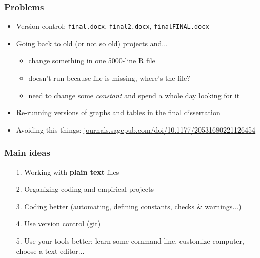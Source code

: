 \documentclass[aspectratio=43]{beamer}
\begin{document}
\begin{frame}
\frametitle{Problems}
\centering

\begin{itemize}
  \item<1-> Version control: \texttt{final.docx}, \texttt{final2.docx}, \texttt{finalFINAL.docx}
  \item<2-> Going back to old (or not so old) projects and...
  \begin{itemize}
    \item change something in one 5000-line R file
    \item doesn't run because file is missing, where's the file?
    \item need to change some \textit{constant} and spend a whole day looking for it
  \end{itemize}
  \item<3-> Re-running versions of graphs and tables in the final dissertation
  \item<4-> Avoiding this things: \href{https://journals.sagepub.com/doi/10.1177/20531680221126454}{journals.sagepub.com/doi/10.1177/20531680221126454}
\end{itemize}

\end{frame}

\begin{frame}
\frametitle{Main ideas}
\centering

\begin{itemize}
  \item[1.] Working with \textbf{plain text} files
  \item[2.] Organizing coding and empirical projects
  \item[3.] Coding better (automating, defining constants, checks \& warnings...)
  \item[4.] Use version control (git)
  \item[5.] Use your tools better: learn some command line, customize computer, choose a text editor...
\end{itemize}

\end{frame}
  
\end{document}
